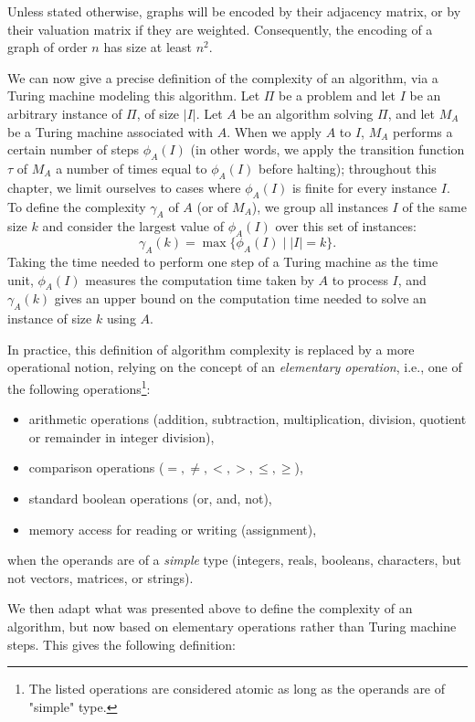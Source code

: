 Unless stated otherwise, graphs will be encoded by their adjacency matrix, or by their valuation matrix if they are weighted. Consequently, the encoding of a graph of order \( n \) has size at least \( n^2 \).

We can now give a precise definition of the complexity of an algorithm, via a Turing machine modeling this algorithm. Let $\Pi$ be a problem and let $I$ be an arbitrary instance of $\Pi$, of size $|I|$. Let $A$ be an algorithm solving $\Pi$, and let $M_A$ be a Turing machine associated with $A$. When we apply $A$ to $I$, $M_A$ performs a certain number of steps $\phi_A(I)$ (in other words, we apply the transition function $\tau$ of $M_A$ a number of times equal to $\phi_A(I)$ before halting); throughout this chapter, we limit ourselves to cases where $\phi_A(I)$ is finite for every instance $I$. To define the complexity $\gamma_A$ of $A$ (or of $M_A$), we group all instances $I$ of the same size $k$ and consider the largest value of $\phi_A(I)$ over this set of instances:
\[
\gamma_A(k) = \max\{\phi_A(I) \mid |I| = k\}.
\]
Taking the time needed to perform one step of a Turing machine as the time unit, $\phi_A(I)$ measures the computation time taken by $A$ to process $I$, and $\gamma_A(k)$ gives an upper bound on the computation time needed to solve an instance of size $k$ using $A$.

In practice, this definition of algorithm complexity is replaced by a more operational notion, relying on the concept of an \textit{elementary operation}, i.e., one of the following operations\footnote{The listed operations are considered atomic as long as the operands are of "simple" type.}:
\begin{itemize}
    \item arithmetic operations (addition, subtraction, multiplication, division, quotient or remainder in integer division),
    \item comparison operations ($=, \neq, <, >, \leq, \geq$),
    \item standard boolean operations (or, and, not),
    \item memory access for reading or writing (assignment),
\end{itemize}
when the operands are of a \textit{simple} type (integers, reals, booleans, characters, but not vectors, matrices, or strings).

We then adapt what was presented above to define the complexity of an algorithm, but now based on elementary operations rather than Turing machine steps. This gives the following definition:

